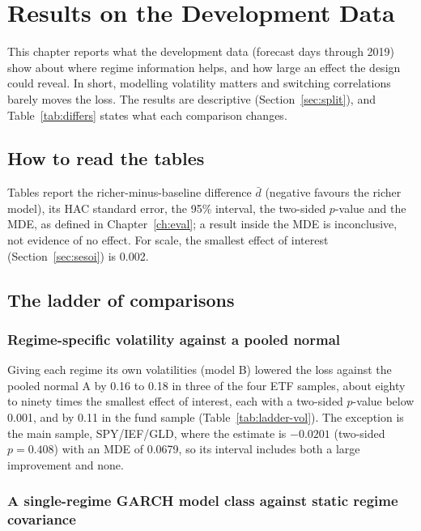 \section{Results on the Development Data}\label{ch:results}

This chapter reports what the development data (forecast days through 2019) show about where regime information helps, and how large an effect the design could reveal. In short, modelling volatility matters and switching correlations barely moves the loss. The results are descriptive (Section~\ref{sec:split}), and Table~\ref{tab:differs} states what each comparison changes.

\subsection{How to read the tables}\label{sec:reading}

Tables report the richer-minus-baseline difference $\bar d$ (negative favours the richer model), its HAC standard error, the 95\% interval, the two-sided $p$-value and the MDE, as defined in Chapter~\ref{ch:eval}; a result inside the MDE is inconclusive, not evidence of no effect. For scale, the smallest effect of interest (Section~\ref{sec:sesoi}) is 0.002.

\subsection{The ladder of comparisons}

\subsubsection{Regime-specific volatility against a pooled normal}\label{sec:vol-results}

Giving each regime its own volatilities (model B) lowered the loss against the pooled normal A by 0.16 to 0.18 in three of the four ETF samples, about eighty to ninety times the smallest effect of interest, each with a two-sided $p$-value below 0.001, and by 0.11 in the fund sample (Table~\ref{tab:ladder-vol}). The exception is the main sample, SPY/IEF/GLD, where the estimate is $-0.0201$ (two-sided $p=0.408$) with an MDE of 0.0679, so its interval includes both a large improvement and none.



\subsubsection{A single-regime GARCH model class against static regime covariance}\label{sec:ladder-results}

